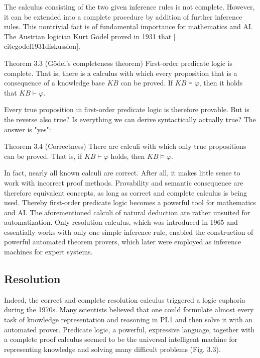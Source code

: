 \documentclass[10pt]{book}
\begin{document}
The calculus consisting of the two given inference rules is not complete. However, it can be extended into a complete procedure by addition of further inference rules. This nontrivial fact is of fundamental importance for mathematics and AI. The Austrian logician Kurt Gödel proved in 1931 that [\\cite{godel1931diskussion}].

Theorem 3.3 (Gödel's completeness theorem) First-order predicate logic is complete. That is, there is a calculus with which every proposition that is a consequence of a knowledge base $K B$ can be proved. If $K B \models \varphi$, then it holds that $K B \vdash \varphi$.

Every true proposition in first-order predicate logic is therefore provable. But is the reverse also true? Is everything we can derive syntactically actually true? The answer is "yes":

Theorem 3.4 (Correctness) There are calculi with which only true propositions can be proved. That is, if $K B \vdash \varphi$ holds, then $K B \models \varphi$.

In fact, nearly all known calculi are correct. After all, it makes little sense to work with incorrect proof methods. Provability and semantic consequence are therefore equivalent concepts, as long as correct and complete calculus is being used. Thereby first-order predicate logic becomes a powerful tool for mathematics and AI. The aforementioned calculi of natural deduction are rather unsuited for automatization. Only resolution calculus, which was introduced in 1965 and essentially works with only one simple inference rule, enabled the construction of powerful automated theorem provers, which later were employed as inference machines for expert systems.

\subsection*{Resolution}
Indeed, the correct and complete resolution calculus triggered a logic euphoria during the 1970s. Many scientists believed that one could formulate almost every task of knowledge representation and reasoning in PL1 and then solve it with an automated prover. Predicate logic, a powerful, expressive language, together with a complete proof calculus seemed to be the universal intelligent machine for representing knowledge and solving many difficult problems (Fig. 3.3).
\end{document}
